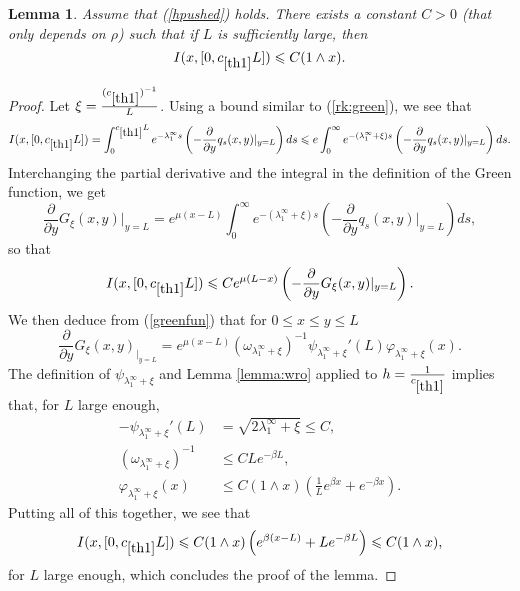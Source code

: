 \documentclass[11pt]{article}
\theoremstyle{plain}
\newtheorem{lemma}{Lemma}[section]
\newcommand\linf{\lambda_1^\infty}
\begin{document}
\begin{lemma} \label{lemma:aL}
Assume that (\ref{hpushed}) holds. There exists a constant $C>0$ (that only depends on $\rho$) such that if $L$ is sufficiently large, then  
\begin{equation*}
     I(x,[0,c_{\ref{th1}}L])\leqslant C(1\wedge x).
\end{equation*}
\end{lemma}
\begin{proof} Let $\xi=\frac{(c_{\ref{th1}})^{-1}}{L}$. Using a bound similar to (\ref{rk:green}), we see that 
\begin{equation*}
   I(x,[0,c_{\ref{th1}}L])= \int_0^{c_{\ref{th1}}L} e^{-\linf s}\left (-\frac{\partial}{\partial y}q_s(x,y)|_{y=L}\right)ds\leqslant e \int_0^\infty  e^{-(\linf+\xi) s}\left (-\frac{\partial}{\partial y}q_s(x,y)|_{y=L}\right)ds.
\end{equation*} Interchanging the partial derivative and the integral in the definition of the Green function, we get
\begin{equation*}
    \frac{\partial}{\partial y}G_{\xi}(x,y)|_{y=L}= e^{\mu(x-L)}\int_0^\infty  e^{-(\linf+\xi) s}\left (-\frac{\partial}{\partial y}q_s(x,y)|_{y=L}\right)ds,
\end{equation*} so that
\begin{equation*}
     I(x,[0,c_{\ref{th1}}L]) \leqslant Ce^{\mu(L-x)}\left(-\frac{\partial}{\partial y} G_{\xi}(x,y)|_{y=L}\right).
\end{equation*} We then deduce from (\ref{greenfun}) that for $0\leqslant x\leqslant y\leqslant L$
\begin{equation*}
\frac{\partial}{\partial y}G_{\xi}(x,y)_{|_{y=L}}=e^{\mu(x-L)}(\omega_{\linf+\xi})^{-1}\psi_{\linf+\xi}'(L)\varphi_{\linf+\xi}(x).
\end{equation*}
The definition of $\psi_{\linf+\xi}$ and Lemma \ref{lemma:wro} applied to $h=\frac{1}{c_{\ref{th1}}}$ implies that, for $L$ large enough,  
\begin{align*}
-\psi_{\linf+\xi}'(L)&=\sqrt{2{\linf+\xi}}\leqslant C,\\
    \left(\omega_{\linf+\xi}\right)^{-1}&\leqslant CLe^{-{\beta}L},\\
    \varphi_{\linf+\xi}(x)&\leqslant C(1\wedge x)\left(\frac{1}{L}e^{\beta x}+e^{-\beta x}\right).
\end{align*}
Putting all of this together, we see that 
    \begin{equation*}
I(x,[0,c_{\ref{th1}}L])\leqslant C(1\wedge x)\left(e^{\beta (x-L)}+Le^{-\beta L}\right)\leqslant C(1\wedge x),
    \end{equation*}
for $L$ large enough, which concludes the proof of the lemma.
\end{proof}
\end{document}
